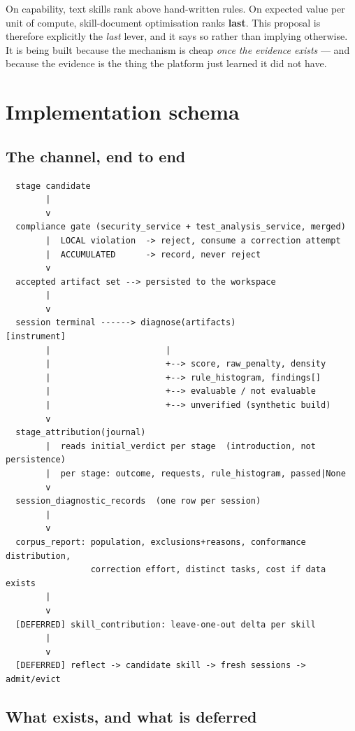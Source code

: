\documentclass[11pt,a4paper]{article}
\begin{document}
\noindent On capability, text skills rank above hand-written rules. On expected
value per unit of compute, skill-document optimisation ranks \textbf{last}. This
proposal is therefore explicitly the \emph{last} lever, and it says so rather than
implying otherwise. It is being built because the mechanism is cheap
\emph{once the evidence exists} --- and because the evidence is the thing the
platform just learned it did not have.

\section{Implementation schema}
\label{sec:schema}

\subsection{The channel, end to end}

\begin{lstlisting}
  stage candidate
        |
        v
  compliance gate (security_service + test_analysis_service, merged)
        |  LOCAL violation  -> reject, consume a correction attempt
        |  ACCUMULATED      -> record, never reject
        v
  accepted artifact set --> persisted to the workspace
        |
        v
  session terminal ------> diagnose(artifacts)                 [instrument]
        |                       |
        |                       +--> score, raw_penalty, density
        |                       +--> rule_histogram, findings[]
        |                       +--> evaluable / not evaluable
        |                       +--> unverified (synthetic build)
        v
  stage_attribution(journal)
        |  reads initial_verdict per stage  (introduction, not persistence)
        |  per stage: outcome, requests, rule_histogram, passed|None
        v
  session_diagnostic_records  (one row per session)
        |
        v
  corpus_report: population, exclusions+reasons, conformance distribution,
                 correction effort, distinct tasks, cost if data exists
        |
        v
  [DEFERRED] skill_contribution: leave-one-out delta per skill
        |
        v
  [DEFERRED] reflect -> candidate skill -> fresh sessions -> admit/evict
\end{lstlisting}

\subsection{What exists, and what is deferred}
\end{document}
